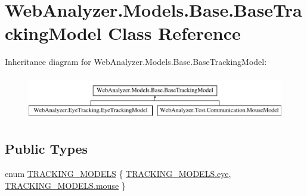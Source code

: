 \hypertarget{class_web_analyzer_1_1_models_1_1_base_1_1_base_tracking_model}{}\section{Web\+Analyzer.\+Models.\+Base.\+Base\+Tracking\+Model Class Reference}
\label{class_web_analyzer_1_1_models_1_1_base_1_1_base_tracking_model}
Inheritance diagram for Web\+Analyzer.\+Models.\+Base.\+Base\+Tracking\+Model\+:\begin{figure}[H]
\begin{center}
\leavevmode
\includegraphics[height=1.937716cm]{class_web_analyzer_1_1_models_1_1_base_1_1_base_tracking_model}
\end{center}
\end{figure}
\subsection*{Public Types}
\begin{DoxyCompactItemize}
\item 
enum \hyperlink{class_web_analyzer_1_1_models_1_1_base_1_1_base_tracking_model_a1a4a0f40cfe65595918f6a41023798ff}{T\+R\+A\+C\+K\+I\+N\+G\+\_\+\+M\+O\+D\+E\+L\+S} \{ \hyperlink{class_web_analyzer_1_1_models_1_1_base_1_1_base_tracking_model_a1a4a0f40cfe65595918f6a41023798ffaf19bd0844e53369373385609e28dbf84}{T\+R\+A\+C\+K\+I\+N\+G\+\_\+\+M\+O\+D\+E\+L\+S.\+eye}, 
\hyperlink{class_web_analyzer_1_1_models_1_1_base_1_1_base_tracking_model_a1a4a0f40cfe65595918f6a41023798ffa40203abe6e81ed98cbc97cdd6ec4f144}{T\+R\+A\+C\+K\+I\+N\+G\+\_\+\+M\+O\+D\+E\+L\+S.\+mouse}
 \}
\end{DoxyCompactItemize}

